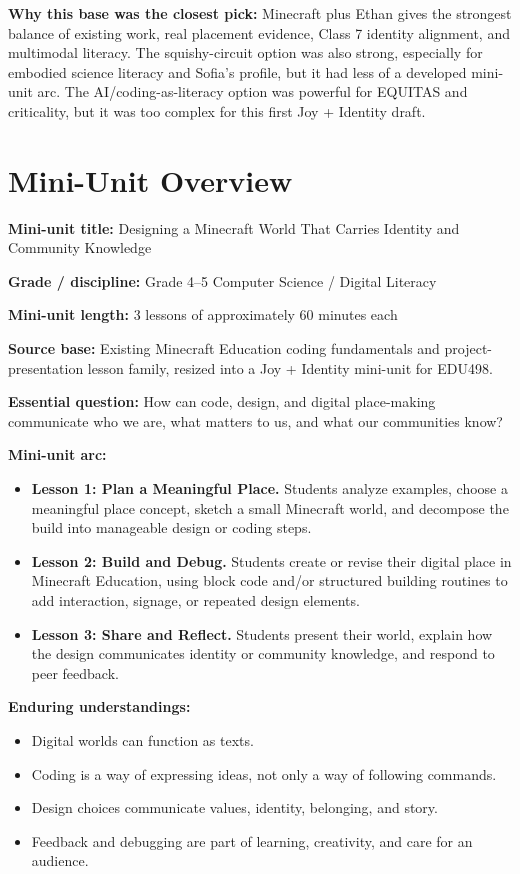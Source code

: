 \documentclass[11pt]{article}
\begin{document}
\textbf{Why this base was the closest pick:} Minecraft plus Ethan gives the strongest balance of existing work, real placement evidence, Class 7 identity alignment, and multimodal literacy. The squishy-circuit option was also strong, especially for embodied science literacy and Sofia's profile, but it had less of a developed mini-unit arc. The AI/coding-as-literacy option was powerful for EQUITAS and criticality, but it was too complex for this first Joy + Identity draft.

\section*{Mini-Unit Overview}

\textbf{Mini-unit title:} Designing a Minecraft World That Carries Identity and Community Knowledge

\textbf{Grade / discipline:} Grade 4--5 Computer Science / Digital Literacy

\textbf{Mini-unit length:} 3 lessons of approximately 60 minutes each

\textbf{Source base:} Existing Minecraft Education coding fundamentals and project-presentation lesson family, resized into a Joy + Identity mini-unit for EDU498.

\textbf{Essential question:} How can code, design, and digital place-making communicate who we are, what matters to us, and what our communities know?

\textbf{Mini-unit arc:}
\begin{itemize}[leftmargin=*]
    \item \textbf{Lesson 1: Plan a Meaningful Place.} Students analyze examples, choose a meaningful place concept, sketch a small Minecraft world, and decompose the build into manageable design or coding steps.
    \item \textbf{Lesson 2: Build and Debug.} Students create or revise their digital place in Minecraft Education, using block code and/or structured building routines to add interaction, signage, or repeated design elements.
    \item \textbf{Lesson 3: Share and Reflect.} Students present their world, explain how the design communicates identity or community knowledge, and respond to peer feedback.
\end{itemize}

\textbf{Enduring understandings:}
\begin{itemize}[leftmargin=*]
    \item Digital worlds can function as texts.
    \item Coding is a way of expressing ideas, not only a way of following commands.
    \item Design choices communicate values, identity, belonging, and story.
    \item Feedback and debugging are part of learning, creativity, and care for an audience.
\end{itemize}
\end{document}
